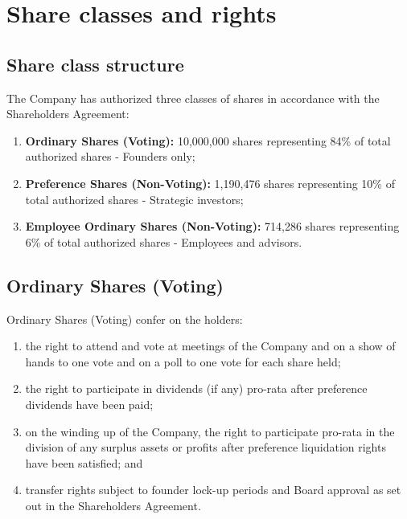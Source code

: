 \section{Share classes and rights}

\subsection{Share class structure}

The Company has authorized three classes of shares in accordance with the Shareholders Agreement:

\begin{enumerate}[label=(\alph*)]
    \item \textbf{Ordinary Shares (Voting):} 10,000,000 shares representing 84\% of total authorized shares - Founders only;
    \item \textbf{Preference Shares (Non-Voting):} 1,190,476 shares representing 10\% of total authorized shares - Strategic investors;
    \item \textbf{Employee Ordinary Shares (Non-Voting):} 714,286 shares representing 6\% of total authorized shares - Employees and advisors.
\end{enumerate}

\subsection{Ordinary Shares (Voting)}

Ordinary Shares (Voting) confer on the holders:

\begin{enumerate}[label=(\alph*)]
    \item the right to attend and vote at meetings of the Company and on a show of hands to one vote and on a poll to one vote for each share held;
    
    \item the right to participate in dividends (if any) pro-rata after preference dividends have been paid;
    
    \item on the winding up of the Company, the right to participate pro-rata in the division of any surplus assets or profits after preference liquidation rights have been satisfied; and
    
    \item transfer rights subject to founder lock-up periods and Board approval as set out in the Shareholders Agreement.
\end{enumerate}

